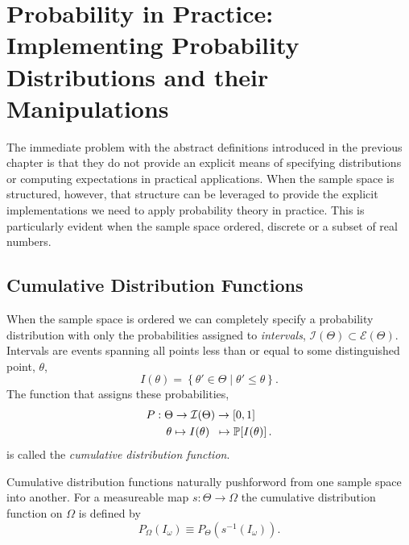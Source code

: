 \chapter{Probability in Practice: \\Implementing Probability Distributions
and their Manipulations}

The immediate problem with the abstract definitions introduced in the
previous chapter is that they do not provide an explicit means of specifying
distributions or computing expectations in practical applications.  When the 
sample space is structured, however, that structure can be leveraged to provide 
the explicit implementations we need to apply probability theory in practice.  
This is particularly evident when the sample space ordered, discrete or a 
subset of real numbers.

\section{Cumulative Distribution Functions}

When the sample space is ordered we can completely specify a probability
distribution with only the probabilities assigned to \emph{intervals}, 
$\mathcal{I} \! \left( \Theta \right) \subset \mathcal{E} \! \left( \Theta \right)$.
Intervals are events spanning all points less than or equal to some 
distinguished point, $\theta$,
%
\begin{equation*}
I \! \left( \theta \right) = \left\{ \theta' \in \Theta \mid \theta' \leq \theta \right\}.
\end{equation*}
%
The function that assigns these probabilities,
%
\begin{align*}
P 
&: \Theta \rightarrow \mathcal{I} \! 
\left( \Theta \right) \rightarrow \left[0, 1 \right]
\\
&\quad \theta \mapsto 
I \! \left( \theta \right) \;\; \mapsto 
\mathbb{P} \! \left[ I \! \left( \theta \right) \right].
\end{align*}
%
is called the \emph{cumulative distribution function}.  

Cumulative distribution functions naturally pushforword from one 
sample space into another.  For a measureable map 
$s : \Theta \rightarrow \Omega$ the cumulative distribution function
on $\Omega$ is defined by
%
\begin{equation*}
P_{\Omega} \! \left( I_{\omega} \right) 
\equiv 
P_{\Theta} \! \left( s^{-1} \! \left( I_{\omega} \right) \right).
\end{equation*}

